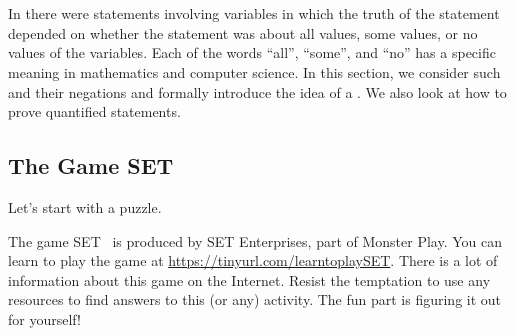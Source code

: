 \section{\secquant}
\label{sec_quant_cex}

In  there were statements involving variables in which the truth of the statement depended on whether the statement was about all values, some values, or no values of the variables.  Each of the words ``all'', ``some'', and ``no'' has a specific meaning in mathematics and computer science.  In this section, we consider such  and their negations and formally introduce the idea of a .  We also look at how to prove quantified statements.


\newcommand{\subsetgame}{The Game SET}
\subsection{\subsetgame}
\label{sub_set_game}

Let's start with a puzzle.

The game SET\texttrademark~ is produced by SET Enterprises, part of Monster Play.  You can learn to play the game at \url{https://tinyurl.com/learntoplaySET}.  There is a lot of information about this game on the Internet. Resist the temptation to use any resources to find answers to this (or any) activity.  The fun part is figuring it out for yourself! 

